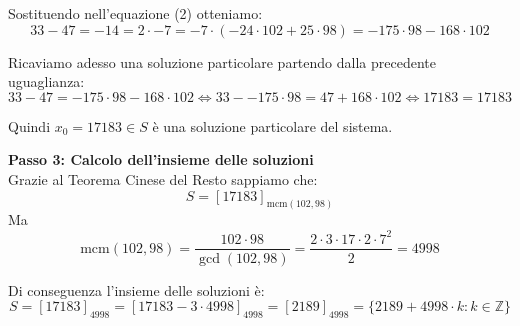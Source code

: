 \documentclass[12pt]{article}
\begin{document}
Sostituendo nell'equazione (2) otteniamo:
$$33 - 47 = -14 = 2 \cdot -7 = -7 \cdot (-24 \cdot 102 + 25 \cdot 98) = -175 \cdot 98 - 168 \cdot 102$$

Ricaviamo adesso una soluzione particolare partendo dalla precedente uguaglianza:
$$33 - 47 = -175 \cdot 98 - 168 \cdot 102 \iff 33 - -175 \cdot 98 = 47 + 168 \cdot 102 \iff 17183 = 17183$$

Quindi $x_0 = 17183 \in S$ è una soluzione particolare del sistema.


\textbf{Passo 3: Calcolo dell'insieme delle soluzioni} \\ 
Grazie al Teorema Cinese del Resto sappiamo che:
$$S = [17183]_{\mathrm{mcm}(102, 98)}$$
Ma
$$\mathrm{mcm}({102}, {98}) = \frac{{102} \cdot {98}}{\gcd({102},{98})} = \frac{{2 \cdot 3 \cdot 17} \cdot {2 \cdot 7^{2}}}{2} = {4998}$$

Di conseguenza l'insieme delle soluzioni è:
        $$S = [17183]_{4998} = [17183 - 3 \cdot 4998]_{4998} = [2189]_{4998} = \{2189 + 4998 \cdot k : k \in \mathbb{Z}\}$$
        
\end{document}
